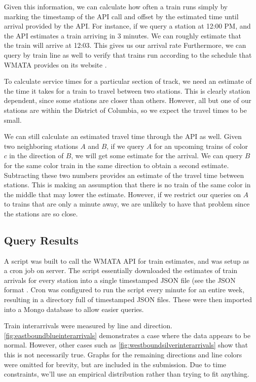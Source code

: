 \documentclass[a4paper,12pt]{article}
\begin{document}
Given this information, we can calculate how often a train runs simply by marking the timestamp of the API call and
offset by the estimated time until arrival provided by the API. For instance, if we query a station at 12:00 PM, and
the API estimates a train arriving in 3 minutes. We can roughly estimate that the train will arrive at 12:03. This
gives us our arrival rate Furthermore, we can query by train line as well to verify that trains run according to the
schedule that WMATA provides on its website \cite{metroschedule}.

To calculate service times for a particular section of track, we need an estimate of the time it takes for a train to
travel between two stations. This is clearly station dependent, since some stations are closer than others. However,
all but one of our stations are within the District of Columbia, so we expect the travel times to be small.

We can still calculate an estimated travel time through the API as well. Given two neighboring stations $A$ and $B$, if
we query $A$ for an upcoming trains of color $c$ in the direction of $B$, we will get some estimate for the arrival. We
can query $B$ for the same color train in the same direction to obtain a second estimate. Subtracting these two numbers
provides an estimate of the travel time between stations. This is making an assumption that there is no train of the
same color in the middle that may lower the estimate. However, if we restrict our queries on $A$ to trains that are only
a minute away, we are unlikely to have that problem since the stations are so close.

\subsection{Query Results}
A script was built to call the WMATA API for train estimates, and was setup as a cron job on server. The script
essentially downloaded the estimates of train arrivals for every station into a single timestamped JSON file (see the
JSON format \cite{json}. Cron \cite{crontab} was configured to run the script every minute for an entire week,
resulting in a directory full of timestamped JSON files. These were then imported into a Mongo \cite{mongodb} database 
to allow easier queries.

Train interarrivals were measured by line and direction. \ref{fig:eastboundblueinterarrivals} demonstrates a case where
the data appears to be normal. However, other cases such as \ref{fig:westboundsilverinterarrivals} show that this is
not necessarily true. Graphs for the remaining directions and line colors were omitted for brevity, but are included in
the submission. Due to time constraints, we'll use an empirical distribution rather than trying to fit anything.
\end{document}
